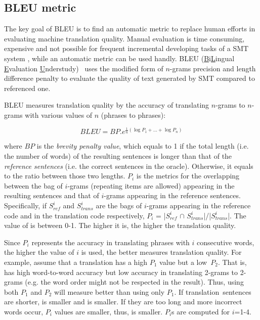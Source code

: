 \subsection{BLEU metric}

The key goal of BLEU is to find an automatic metric to replace human
efforts in evaluating machine translation quality. Manual evaluation
is time consuming, expensive and not possible for frequent incremental
developing tasks of a SMT system \cite{Papineni2002}, while an
automatic metric can be used handly. BLEU
(\underline{B}i\underline{L}ingual \underline{E}valuation
\underline{U}nderstudy)~\cite{Papineni2002} uses the modified form of $n$-grams precision
and length difference penalty to evaluate the quality of text
generated by SMT compared to referenced one.

BLEU measures
translation quality by the accuracy of translating $n$-grams to
$n$-grams with various values of $n$ (phrases to phrases):

\[BLEU = BP.{e^{\frac{1}{n}(\log {P_1} + ... + \log {P_n})}}\]

where $BP$ is the {\em brevity penalty value}, which equals to 1 if
the total length (i.e. the number of words) of the resulting sentences
is longer than that of the {\em reference sentences} (i.e. the correct
sentences in the oracle). Otherwise, it equals to the ratio between
those two lengths. $P_i$ is the metrics for the overlapping between
the bag of $i$-grams (repeating items are allowed) appearing in the
resulting sentences and that of $i$-grams appearing in the reference
sentences. Specifically, if $S^{i}_{ref}$ and $S^{i}_{trans}$ are the
bags of $i$-grams appearing in the reference code and in the
translation code respectively, $P_i$ = |$S^{i}_{ref}$ $\cap$
$S^{i}_{trans}$|/|$S^{i}_{trans}$|. The value of  is
between 0-1. The higher it is, the higher the translation quality.

Since $P_i$ represents the accuracy in translating phrases
with $i$ consecutive words, the higher the value of $i$ is used, the
better  measures translation quality. For example, assume
that a translation  has a high $P_1$ value but a
low~$P_2$. That is,  has high word-to-word accuracy but low
accuracy in translating 2-grams to 2-grams (e.g. the word order might
not be respected in the result). Thus, using both $P_1$ and $P_2$ will
measure  better than using only $P_1$. If
translation~sen\-tences are shorter,  is smaller and
 is smaller. If they are too long and more incorrect words
occur, $P_i$ values are smaller, thus,  is smaller. $P_i$s
are computed for $i$=1-4.
